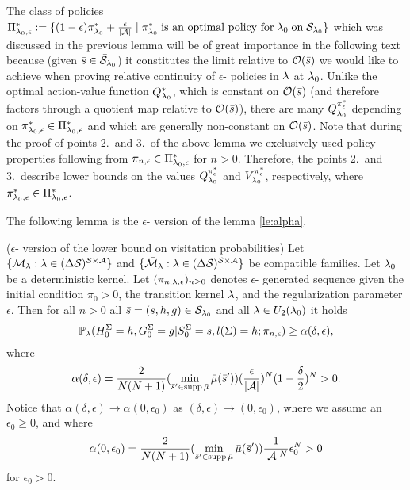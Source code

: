 The class of policies $\Pi_{\mathit{\lambda}_0,\epsilon}^* := \{(1-\epsilon) \pi_{\mathit{\lambda}_0}^* + \frac{\epsilon}{|\mathcal{A}|} \mid \pi_{\mathit{\lambda}_0}^*\; \text{is an optimal policy for}\; \mathit{\lambda}_0 \;\text{on}\; \bar{\mathcal{S}}_{\mathit{\lambda}_0} \}$
which was discussed in the previous lemma 
will be of great importance in the
following text because (given $\bar{s}\in \bar{\mathcal{S}}_{\mathit{\lambda}_0}$) it constitutes
the limit relative to $\mathcal{O}(\bar{s})$ we would like to achieve when proving
relative continuity of $\epsilon$-\eUDRL{} policies in $\mathit{\lambda}$ at $\mathit{\lambda}_0$.
Unlike the optimal action-value function
$Q_{\mathit{\lambda}_0}^*$, which is constant on 
$\mathcal{O}(\bar{s})$ (and therefore factors through a quotient map relative to $\mathcal{O}(\bar{s})$), there are many $Q_{\mathit{\lambda}_0}^{\pi_{\epsilon}^*}$ depending on $\pi_{\mathit{\lambda}_0,\epsilon}^*\in \Pi_{\mathit{\lambda}_0,\epsilon}^*$ and which are generally non-constant on $\mathcal{O}(\bar{s})$.
Note that during the proof of points 2.\ and 3.\ of the above lemma 
we exclusively used policy properties following from $\pi_{n,\epsilon} \in \Pi_{\mathit{\lambda}_0,\epsilon}^*$ for $n>0$. Therefore,
the points 2.\ and 3.\ describe
lower bounds on the values $Q_{\mathit{\lambda}_0}^{\pi_{\epsilon}^*}$ and $V_{\mathit{\lambda}_0}^{\pi_{\epsilon}^*}$, respectively, where $\pi_{\mathit{\lambda}_0,\epsilon}^* \in \Pi_{\mathit{\lambda}_0,\epsilon}^*$.



The following lemma is the $\epsilon$-\eUDRL{} version of the lemma \ref{le:alpha}.
\begin{lemma}
\label{le:ealpha} ($\epsilon$-\eUDRL{} version of the lower bound on visitation probabilities)
Let 
$\{\mathcal{M}_{\mathit{\lambda}} : \mathit{\lambda} \in (\Delta \mathcal{S})^{\mathcal{S}\times\mathcal{A}}\}$
and $\{\bar{\mathcal{M}}_{\mathit{\lambda}} : \mathit{\lambda} \in (\Delta \mathcal{S})^{\mathcal{S}\times\mathcal{A}}\}$ be compatible families.
Let $\mathit{\lambda}_0$ be a deterministic kernel. Let $(\pi_{n,\mathit{\lambda},\epsilon})_{n\geq 0}$ denotes $\epsilon$-\eUDRL{} generated sequence given
the initial condition $\pi_0>0$, the transition kernel $\mathit{\lambda}$, and the regularization parameter $\epsilon$.
Then for all $n>0$ all $\bar{s} = (s,h,g)\in\bar{\mathcal{S}}_{\mathit{\lambda}_0}$ and all $\mathit{\lambda}\in U_2(\mathit{\lambda}_0)$ it holds
$$
\mathbb{P}_{\mathit{\lambda}}(H^{\Sigma}_0=h, G^{\Sigma}_0=g | S^{\Sigma}_0=s, l(\Sigma)=h; \pi_{n,\epsilon}) \geq \alpha(\delta,\epsilon),
$$
where
$$
\alpha(\delta,\epsilon) = 
\frac{2}{N(N+1)}
(\min_{\bar{s}'\in \operatorname*{\mathrm{supp}} \bar{\mu}}\bar{\mu}(\bar{s}'))
(\frac{\epsilon}{|\mathcal{A}|})^N
(1-\frac{\delta}{2})^N
> 0.
$$
Notice that
$
\alpha(\delta,\epsilon) \rightarrow \alpha(0,\epsilon_0)$ as $(\delta,\epsilon) \rightarrow (0,\epsilon_0)$,
where we assume an $\epsilon_0 \geq 0$, and where
$$
\alpha(0,\epsilon_0) = 
\frac{2}{N(N+1)}
(\min_{\bar{s}'\in \operatorname*{\mathrm{supp}} \bar{\mu}}\bar{\mu}(\bar{s}'))
\frac{1}{|\mathcal{A}|^N}\epsilon_0^N > 0
$$
for $\epsilon_0 > 0$.
\end{lemma}

